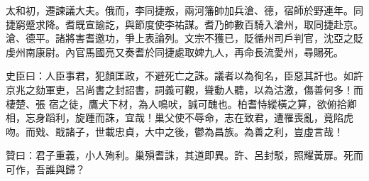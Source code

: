 \begin{pinyinscope}
 太和初，遷諫議大夫。俄而，李同捷叛，兩河籓帥加兵滄、德，宿師於野連年。同
 捷窮蹙求降。耆既宣諭訖，與節度使李祐謀。耆乃帥數百騎入滄州，取同捷赴京。滄、德平。諸將害耆邀功，爭上表論列。文宗不獲已，貶循州司戶判官，沈亞之貶虔州南康尉。內官馬國亮又奏耆於同捷處取婢九人，再命長流愛州，尋賜死。



 史臣曰：人臣事君，犯顏匡政，不避死亡之誅。議者以為徇名，臣惡其訐也。如許京兆之劾軍吏，呂尚書之封詔書，詞義可觀，聳動人聽，以為沽激，傷善何多！而棲楚、張
 宿之徒，鷹犬下材，為人鳴吠，誠可醜也。柏耆恃縱橫之算，欲俯拾卿相，忘身蹈利，旋踵而誅，宜哉！巢父使不辱命，志在致君，遭罹喪亂，竟陷虎吻。而戣、戢諸子，世載忠貞，大中之後，鬱為昌族。為善之利，豈虛言哉！



 贊曰：君子重義，小人殉利。巢殞耆誅，其道即異。許、呂封駁，照耀黃扉。死而可作，吾誰與歸？



\end{pinyinscope}